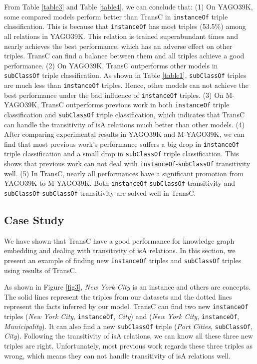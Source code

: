 \documentclass[11pt,a4paper]{article}
\begin{document}
  From Table \ref{table3} and Table \ref{table4}, we can conclude that: (1) On YAGO39K,  some compared models perform better than TransC in \texttt{instanceOf}
  triple classification. This is because that \texttt{instanceOf} has most triples (53.5\%) among all relations in YAGO39K. 
  This relation is trained superabundant times and nearly achieves the best performance, which has an adverse effect on
  other triples. TransC can find a balance between them and all triples achieve a good performance.
  (2) On YAGO39K, TransC outperforms other models in \texttt{subClassOf} triple classification. As shown in Table \ref{table1}, \texttt{subClassOf} triples are much 
  less than \texttt{instanceOf} triples. Hence, other models can not achieve the best performance under 
  the bad influence of \texttt{instanceOf} triples. (3) On M-YAGO39K, TransC outperforms previous work in both \texttt{instanceOf} triple
  classification and \texttt{subClassOf} triple classification, which indicates that TransC can handle the transitivity of isA relations
  much better than other models. (4) After comparing experimental results in YAGO39K and M-YAGO39K, we can find that most previous work's performance 
  suffers a big drop in \texttt{instanceOf} triple classification and a small drop in \texttt{subClassOf} triple classification.
  This shows that previous work can not deal with \texttt{instanceOf}-\texttt{subClassOf} transitivity well.
  (5) In TransC, nearly all performances have a significant promotion from YAGO39K to M-YAGO39K. Both \texttt{instanceOf}-\texttt{subClassOf} transitivity and
  \texttt{subClassOf}-\texttt{subClassOf} transitivity are solved well in TransC.
  
  \subsection{Case Study}
  
  We have shown that TransC have a good performance for knowledge graph embedding and dealing with transitivity of isA relations.
  In this section, we present an example of finding new \texttt{instanceOf} triples and \texttt{subClassOf} triples using results of TransC.
  
  As shown in Figure \ref{fig3}, \textit{New York City} is an instance and others are concepts. 
  The solid lines represent the triples from our datasets and the dotted lines represent the facts 
  inferred by our model. TransC can find two new \texttt{instanceOf} triples (\textit{New York City}, \texttt{instanceOf}, \textit{City}) and
  (\textit{New York City}, \texttt{instanceOf}, \textit{Municipality}). It can also find a new \texttt{subClassOf} triple (\textit{Port Cities}, \texttt{subClassOf}, \textit{City}).
  Following the transitivity of isA relations, we can know all these three new triples are right.
  Unfortunately, most previous work regards these three triples as wrong, which means they can not handle transitivity of isA relations well.
  
\end{document}
